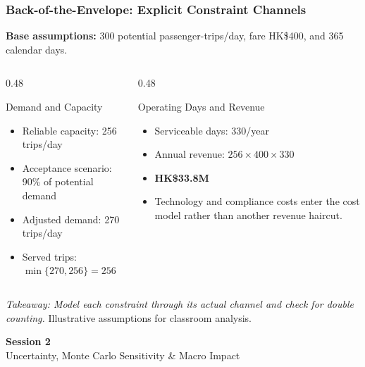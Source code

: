 \documentclass{beamer}
\begin{document}
\begin{frame}[t,shrink=12]
\frametitle{Back-of-the-Envelope: Explicit Constraint Channels}
\textbf{Base assumptions:} 300 potential passenger-trips/day, fare HK\$400, and 365 calendar days.
\begin{columns}[T]
\begin{column}{0.48\textwidth}\begin{block}{Demand and Capacity}
\begin{itemize}
\item Reliable capacity: 256 trips/day
\item Acceptance scenario: 90\% of potential demand
\item Adjusted demand: 270 trips/day
\item Served trips: $\min\{270,256\}=256$
\end{itemize}\end{block}\end{column}
\begin{column}{0.48\textwidth}\begin{block}{Operating Days and Revenue}
\begin{itemize}
\item Serviceable days: 330/year
\item Annual revenue: $256\times400\times330$
\item \textbf{HK\$33.8M}
\item Technology and compliance costs enter the cost model rather than another revenue haircut.
\end{itemize}\end{block}\end{column}
\end{columns}
\textit{Takeaway: Model each constraint through its actual channel and check for double counting.}
\vfill{\tiny Illustrative assumptions for classroom analysis.}
\end{frame}


\begin{frame}[c]
  \begin{center}
    \huge\color{cuhkpurple}\textbf{Session 2}\\
    \vspace{0.5cm}
    \Large Uncertainty, Monte Carlo Sensitivity \& Macro Impact
  \end{center}
\end{frame}
\end{document}
